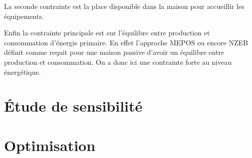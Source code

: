La seconde contrainte est la place disponible dans la maison pour accueillir les
équipements.

Enfin la contrainte principale est sur l’équilibre entre production et consommation
d’énergie primaire. En effet l’approche MEPOS ou encore NZEB définit comme requit
pour une maison passive d’avoir un équilibre entre production et consommation.
On a donc ici une contrainte forte au niveau énergétique.




\section{Étude de sensibilité} %
\label{sec:etude_de_sensibilite}




\section{Optimisation} %
\label{sec:optimisation}
